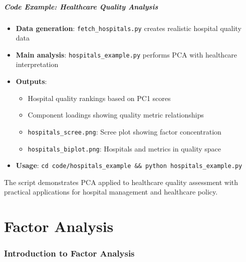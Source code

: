 \documentclass[aspectratio=169]{beamer}
\begin{document}
\begin{frame}
    \frametitle{Code Example: Healthcare Quality Analysis}
    \begin{itemize}
        \item \textbf{Data generation}: \texttt{fetch\_hospitals.py} creates realistic hospital quality data \pause
        \item \textbf{Main analysis}: \texttt{hospitals\_example.py} performs PCA with healthcare interpretation \pause
        \item \textbf{Outputs}:
              \begin{itemize}
                  \item Hospital quality rankings based on PC1 scores \pause
                  \item Component loadings showing quality metric relationships \pause
                  \item \texttt{hospitals\_scree.png}: Scree plot showing factor concentration \pause
                  \item \texttt{hospitals\_biplot.png}: Hospitals and metrics in quality space \pause
              \end{itemize}
        \item \textbf{Usage}: \texttt{cd code/hospitals\_example \&\& python hospitals\_example.py} \pause
    \end{itemize}
    \vspace{6pt}
    The script demonstrates PCA applied to healthcare quality assessment with practical applications for hospital management and healthcare policy.
\end{frame}


\part{Factor Analysis}

\begin{frame}
    \partpage
\end{frame}

\section{Introduction to Factor Analysis}
\end{document}
